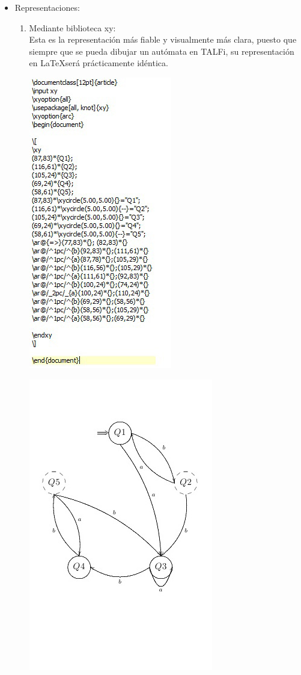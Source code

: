 \documentclass[12pt,a4paper,spanish]{book}
\begin{document}
\begin{itemize}
\item Representaciones:\\
\begin{enumerate}
\item Mediante biblioteca xy:\\
\newline
Esta es la representaci\'on m\'as fiable y visualmente m\'as clara, puesto que siempre que se pueda dibujar un aut\'omata en TALFi, su representaci\'on en \LaTeX ser\'a pr\'acticamente id\'entica.\\
\begin{center}
\includegraphics{lateaux.jpg}
\end{center}
\begin{center}
\includegraphics{lateaux2.jpg}
\end{center}



\end{enumerate}
\end{itemize}
\end{document}
